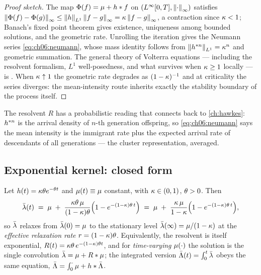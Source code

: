 \begin{proof}[Proof sketch]
The map $\Phi(f) = \mu + h * f$ on
$(L^\infty[0,T], \left\lVert\cdot\right\rVert_\infty)$ satisfies
$\left\lVert\Phi(f)-\Phi(g)\right\rVert_\infty \le \left\lVert h\right\rVert_{L^1}
\left\lVert f-g\right\rVert_\infty = \kappa\left\lVert f-g\right\rVert_\infty$, a contraction since
$\kappa<1$; Banach's fixed point theorem gives existence, uniqueness among
bounded solutions, and the geometric rate. Unrolling the iteration gives
the Neumann series \cref{eq:ch06:neumann}, whose mass identity follows from
$\left\lVert h^{*n}\right\rVert_{L^1} = \kappa^n$ and geometric summation. The
general theory of Volterra equations --- including the resolvent
formalism, $L^1$ well-posedness, and what survives when
$\kappa \ge 1$ locally --- is \citet{gripenberg1990}. When
$\kappa \uparrow 1$ the geometric rate degrades as $(1-\kappa)^{-1}$ and
at criticality the series diverges: the mean-intensity route inherits
exactly the stability boundary of the process itself.
\end{proof}

The resolvent $R$ has a probabilistic reading that connects back to
\cref{ch:hawkes}: $h^{*n}$ is the arrival density of $n$-th
generation offspring, so \cref{eq:ch06:neumann} says the mean intensity is
the immigrant rate plus the expected arrival rate of descendants of all
generations --- the cluster representation, averaged.

\subsection{Exponential kernel: closed form}\label{ch06:sec:closedform}

\begin{proposition}\label{prop:ch06:expclosed}
Let $h(t) = \kappa\theta e^{-\theta t}$ and $\mu(t)\equiv\mu$
constant, with $\kappa\in(0,1)$, $\theta>0$. Then
\begin{equation}\label{eq:ch06:expclosed}
\bar{\lambda}(t)
 \;=\;
 \mu \;+\; \frac{\kappa\theta\,\mu}{(1-\kappa)\theta}
 \Big(1 - e^{-(1-\kappa)\theta\, t}\Big)
 \;=\;
 \mu \;+\; \frac{\kappa\,\mu}{1-\kappa}
 \Big(1 - e^{-(1-\kappa)\theta\, t}\Big),
\end{equation}
so $\bar{\lambda}$ relaxes from $\bar{\lambda}(0)=\mu$ to the stationary level
$\bar{\lambda}(\infty) = \mu/(1-\kappa)$ at the \emph{effective relaxation
rate} $r = (1-\kappa)\theta$. Equivalently, the resolvent is itself
exponential, $R(t) = \kappa\theta\, e^{-(1-\kappa)\theta t}$, and for
\emph{time-varying} $\mu(\cdot)$ the solution is the single convolution
$\bar{\lambda} = \mu + R*\mu$; the integrated version
$\bar{\Lambda}(t) = \int_0^t \bar{\lambda}$ obeys the same equation,
$\bar{\Lambda} = \int_0^\cdot \mu + h * \bar{\Lambda}$.
\end{proposition}

